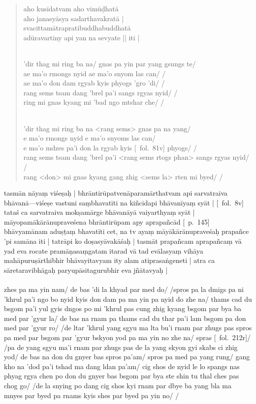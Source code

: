 \documentclass[12pt]{article}
\newcommand{\emdash} {\hspace{0em}—\hspace{0em}}
\begin{document}
\begin{quote}
	aho kusīdatvam aho vimūḍhatā\\
	aho janasyāsya sadarthavakratā |\\
	svacittamātrapratibuddhabuddhatā\\
	adūravartiny api yan na sevyate || iti |

	\textbf{\TVA}\\
	'dir thag mi ring ba na/ gnas pa yin par yang gsungs te/\\
	ae ma'o rmongs nyid ae ma'o snyom las can/ /\\
	ae ma'o don dam rgyab kyis phyogs 'gro 'di/ /\\
	rang sems tsam dang 'brel pa'i sangs rgyas nyid/ /\\
	ring mi gnas kyang mi 'bad ngo mtshar che/ /

	\textbf{\TVB}\\
	'dir thag mi ring ba na <rang sems> gnas pa na yang/\\
	e ma'o rmongs nyid e ma'o snyoms las can/\\
	e ma'o mdzes pa'i don la rgyab kyis [\TVB\ fol.\ 81v] phyogs/ /\\
	rang sems tsam dang 'brel pa'i <rang sems rtogs phan> sangs rgyas nyid/ /\\
	rang <don> mi gnas kyang gang zhig <sems la> rten mi byed/ /
\end{quote}

tasmān nāyaṃ viśeṣaḥ | bhrāntirūpatvenāparamārthatvam api sarvatraiva bhāvanā\emdash viśeṣe vastuni saṃbhavatīti na kiñcidapi bhāvanīyaṃ syāt | [\MS\ fol.\ 8v] tataś ca sarvatraiva mokṣamārge bhāvanāyā vaiyarthyaṃ syāt | māyopamākārānupraveśena bhrāntirūpam apy aprapañcād [\EDD\ p.\ 145] bhāvyamānam aduṣṭaṃ bhavatīti cet, na tv ayaṃ māyākārānupraveśaḥ prapañce 'pi samāna iti | tatrāpi ko doṣasyāvakāśaḥ | tasmāt prapañcam aprapañcaṃ vā yad eva rocate pramāṇasaṃgatam itarad vā tad evālasyaṃ vihāya mahāpuruṣārthibhir bhāvayitavyam ity alam atiprasaṅgeneti | atra ca sāretaravibhāgaḥ paryupāsitagurubhir eva jñātavyaḥ |\\

\textbf{\TVA}\\
zhes pa ma yin nam/ de bas 'di la khyad par med do/ /spros pa la dmigs pa ni 'khrul pa'i ngo bo nyid kyis don dam pa ma yin pa nyid do zhe na/ thams cad du bsgom pa'i yul gyis dngos po mi 'khrul pas cung zhig kyang bsgom par bya ba med par 'gyur la/ de bas na rnam pa thams cad du thar pa'i lam bsgom pa don med par 'gyur ro/ /de ltar 'khrul yang sgyu ma lta bu'i rnam par zhugs pas spros pa med par bsgom par 'gyur bskyon yod pa ma yin no zhe na/ spras [\TVA\ fol.\ 212r]/ /pa de yang sgyu ma'i rnam par zhugs pas de la yang skyon gyi skabs ci zhig yod/ de bas na don du gnyer bas spros pa'am/ spros pa med pa yang rung/ gang kho na 'dod pa'i tshad ma dang ldan pa'am/ cig shos de nyid le lo spangs nas phyag rgya chen po don du gnyer bas bsgom par bya ste shin tu thal ches pas chog go/ /de la snying po dang cig shos kyi rnam par dbye ba yang bla ma mnyes par byed pa rnams kyis shes par byed pa yin no/ /\\
\end{document}
